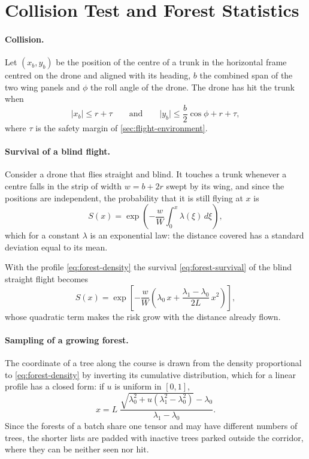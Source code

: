\section{Collision Test and Forest Statistics}
\label{app:forest-math}

\paragraph{Collision.} Let $(x_b, y_b)$ be the position of the centre of a trunk in the horizontal frame centred on the drone and aligned with its heading, $b$ the combined span of the two wing panels and $\phi$ the roll angle of the drone. The drone has hit the trunk when
\begin{equation}
\lvert x_b \rvert \le r + \tau \qquad \text{and} \qquad \lvert y_b \rvert \le \frac{b}{2}\cos\phi + r + \tau ,
\label{eq:forest-collision}
\end{equation}
where $\tau$ is the safety margin of \autoref{sec:flight-environment}.

\paragraph{Survival of a blind flight.} Consider a drone that flies straight and blind. It touches a trunk whenever a centre falls in the strip of width $w = b + 2r$ swept by its wing, and since the positions are independent, the probability that it is still flying at $x$ is
\begin{equation}
S(x) = \exp\!\left( -\frac{w}{W} \int_0^x \lambda(\xi)\, d\xi \right),
\label{eq:forest-survival}
\end{equation}
which for a constant $\lambda$ is an exponential law: the distance covered has a standard deviation equal to its mean.

With the profile \eqref{eq:forest-density} the survival \eqref{eq:forest-survival} of the blind straight flight becomes
\begin{equation}
S(x) = \exp\!\left[ -\frac{w}{W} \left( \lambda_0\, x + \frac{\lambda_1 - \lambda_0}{2L}\, x^2 \right) \right],
\label{eq:forest-survival-growing}
\end{equation}
whose quadratic term makes the risk grow with the distance already flown.

\paragraph{Sampling of a growing forest.} The coordinate of a tree along the course is drawn from the density proportional to \eqref{eq:forest-density} by inverting its cumulative distribution, which for a linear profile has a closed form: if $u$ is uniform in $[0,1]$,
\begin{equation}
x = L\; \frac{\sqrt{\lambda_0^2 + u\left(\lambda_1^2 - \lambda_0^2\right)} - \lambda_0}{\lambda_1 - \lambda_0} .
\label{eq:forest-inverse-cdf}
\end{equation} Since the forests of a batch share one tensor and may have different numbers of trees, the shorter lists are padded with inactive trees parked outside the corridor, where they can be neither seen nor hit.

